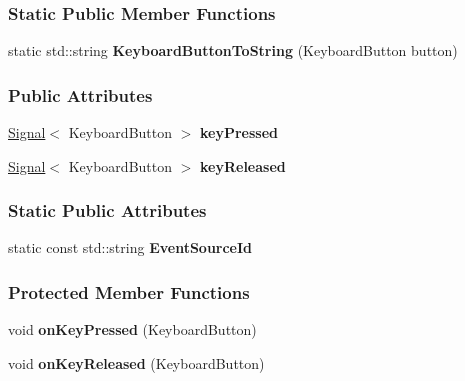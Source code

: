 \subsubsection*{Static Public Member Functions}
\begin{DoxyCompactItemize}
\item 
static std\+::string {\bfseries Keyboard\+Button\+To\+String} (Keyboard\+Button button)\hypertarget{a00055_a4204702d8f964a109136545690686585}{}\label{a00055_a4204702d8f964a109136545690686585}

\end{DoxyCompactItemize}
\subsubsection*{Public Attributes}
\begin{DoxyCompactItemize}
\item 
\hyperlink{a00065}{Signal}$<$ Keyboard\+Button $>$ {\bfseries key\+Pressed}\hypertarget{a00055_a96ef16f70810ff3ceffde1ad71f9291f}{}\label{a00055_a96ef16f70810ff3ceffde1ad71f9291f}

\item 
\hyperlink{a00065}{Signal}$<$ Keyboard\+Button $>$ {\bfseries key\+Released}\hypertarget{a00055_a081464fd7756415ad9c78e80e850cbea}{}\label{a00055_a081464fd7756415ad9c78e80e850cbea}

\end{DoxyCompactItemize}
\subsubsection*{Static Public Attributes}
\begin{DoxyCompactItemize}
\item 
static const std\+::string {\bfseries Event\+Source\+Id}\hypertarget{a00055_a11ae52b8b6e7519d0b3ea42561d6dccd}{}\label{a00055_a11ae52b8b6e7519d0b3ea42561d6dccd}

\end{DoxyCompactItemize}
\subsubsection*{Protected Member Functions}
\begin{DoxyCompactItemize}
\item 
void {\bfseries on\+Key\+Pressed} (Keyboard\+Button)\hypertarget{a00055_a5072ad733814bd17d46e36ea8be4a4b4}{}\label{a00055_a5072ad733814bd17d46e36ea8be4a4b4}

\item 
void {\bfseries on\+Key\+Released} (Keyboard\+Button)\hypertarget{a00055_a000acdad189778380e4ac141dd4619cb}{}\label{a00055_a000acdad189778380e4ac141dd4619cb}

\end{DoxyCompactItemize}


